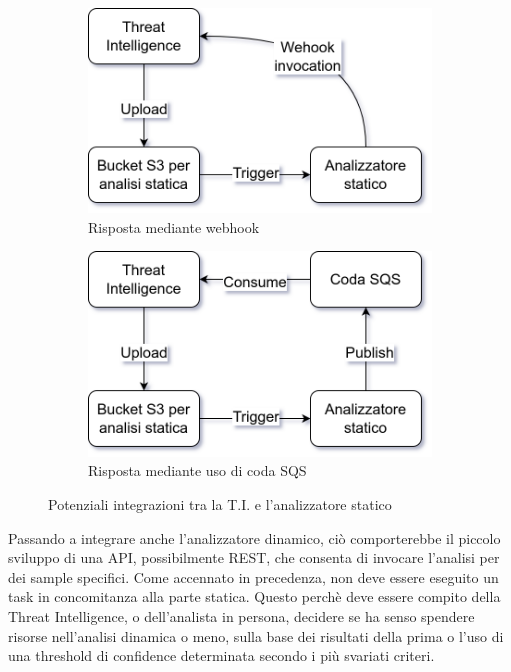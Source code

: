\begin{figure}[htbp]
    \centering
    \begin{subfigure}[t]{0.48\textwidth}
        \centering
        \includegraphics[width=\textwidth]{assets/ti_webhook.png}
        \caption{Risposta mediante webhook}
    \end{subfigure}
    \begin{subfigure}[t]{0.48\textwidth}
        \centering
        \includegraphics[width=\textwidth]{assets/ti_sqs.png}
        \caption{Risposta mediante uso di coda SQS}
    \end{subfigure}
    \caption{Potenziali integrazioni tra la T.I. e l'analizzatore statico}
    \label{fig:future_threat_intell_analyzer_integrations}
\end{figure}

\bigskip

Passando a integrare anche l'analizzatore dinamico, ciò comporterebbe il piccolo sviluppo di una API, possibilmente REST, che consenta di invocare l'analisi per dei sample specifici.
Come accennato in precedenza, non deve essere eseguito un task in concomitanza alla parte statica. Questo perchè deve essere compito della Threat Intelligence, o dell'analista in persona, decidere se ha senso spendere risorse nell'analisi dinamica o meno, sulla base dei risultati della prima o l'uso di una threshold di confidence determinata secondo i più svariati criteri.

